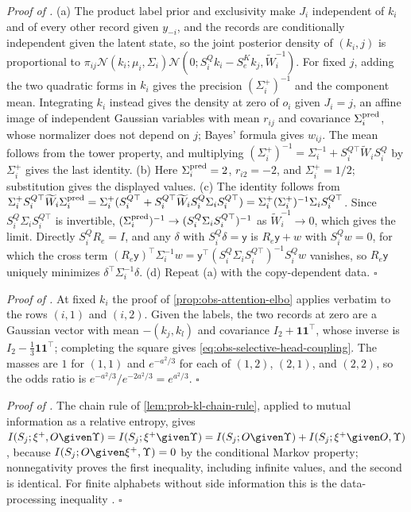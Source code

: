 \noindent\emph{Proof of .}
(a) The product label prior and exclusivity make \(J_i\) independent of \(k_i\)
and of every other record given \(y_{-i}\), and the records are conditionally
independent given the latent state, so the joint posterior density of
\((k_i,j)\) is proportional to \(\pi_{ij}\mathcal N(k_i;\mu_i,\Sigma_i)
\mathcal N(0;S^Q_ik_i-S^K_ek_j,\widetilde W_i^{-1})\). For fixed \(j\), adding
the two quadratic forms in \(k_i\) gives the precision \((\Sigma_i^+)^{-1}\) and
the component mean. Integrating \(k_i\) instead gives the density at zero of
\(o_i\) given \(J_i=j\), an affine image of independent Gaussian variables with
mean \(r_{ij}\) and covariance \(\Sigma_i^{\rm pred}\), whose normalizer does
not depend on \(j\); Bayes' formula gives \(w_{ij}\). The mean follows from the
tower property, and multiplying
\((\Sigma_i^+)^{-1}=\Sigma_i^{-1}+S_i^{Q\top}\widetilde W_iS^Q_i\) by
\(\Sigma_i^+\) gives the last identity. (b) Here \(\Sigma_i^{\rm pred}=2\),
\(r_{i2}=-2\), and \(\Sigma_i^+=1/2\); substitution gives the displayed values.
(c) The identity follows from
\(\Sigma_i^+S_i^{Q\top}\widetilde W_i\Sigma_i^{\rm pred}
=\Sigma_i^+(S_i^{Q\top}+S_i^{Q\top}\widetilde W_iS^Q_i\Sigma_iS_i^{Q\top})
=\Sigma_i^+(\Sigma_i^+)^{-1}\Sigma_iS_i^{Q\top}\). Since
\(S^Q_i\Sigma_iS_i^{Q\top}\) is invertible,
\((\Sigma_i^{\rm pred})^{-1}\to(S^Q_i\Sigma_iS_i^{Q\top})^{-1}\) as
\(\widetilde W_i^{-1}\to0\), which gives the limit. Directly \(S^Q_iR_e=I\), and
any \(\delta\) with \(S^Q_i\delta=\mathsf y\) is \(R_e\mathsf y+w\) with
\(S^Q_iw=0\), for which the cross term
\((R_e\mathsf y)^\top\Sigma_i^{-1}w=\mathsf y^\top(S^Q_i\Sigma_iS_i^{Q\top})^{-1}S^Q_iw\)
vanishes, so \(R_e\mathsf y\) uniquely minimizes \(\delta^\top\Sigma_i^{-1}\delta\).
(d) Repeat (a) with the copy-dependent data. \(\square\)

\noindent\emph{Proof of .}
At fixed \(k_i\) the proof of \cref{prop:obs-attention-elbo} applies verbatim
to the rows \((i,1)\) and \((i,2)\). Given the labels, the two records at zero
are a Gaussian vector with mean \(-(k_j,k_l)\) and covariance
\(I_2+\mathbf 1\mathbf 1^\top\), whose inverse is
\(I_2-\frac13\mathbf 1\mathbf 1^\top\); completing the square gives
\eqref{eq:obs-selective-head-coupling}. The masses are \(1\) for \((1,1)\) and
\(e^{-a^2/3}\) for each of \((1,2)\), \((2,1)\), and \((2,2)\), so the odds
ratio is \(e^{-a^2/3}/e^{-2a^2/3}=e^{a^2/3}\). \(\square\)

\noindent\emph{Proof of .}
The chain rule of \cref{lem:prob-kl-chain-rule}, applied to mutual information
as a relative entropy, gives
\(I(S_j;\xi^+,O\given\Upsilon)=I(S_j;\xi^+\given\Upsilon)
=I(S_j;O\given\Upsilon)+I(S_j;\xi^+\given O,\Upsilon)\), because
\(I(S_j;O\given\xi^+,\Upsilon)=0\) by the conditional Markov property;
nonnegativity proves the first inequality, including infinite values, and the
second is identical. For finite alphabets without side information this is the
data-processing inequality \citep[Section 2.8, Theorem 2.8.1]{CoverThomas2006}.
\(\square\)

